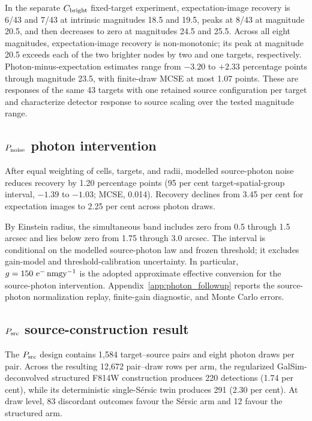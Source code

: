 In the separate \(C_{\rm bright}\) fixed-target experiment,
expectation-image recovery is 6/43 and 7/43 at intrinsic magnitudes 18.5 and 19.5,
peaks at 8/43 at magnitude 20.5, and then decreases to zero at magnitudes 24.5
and 25.5. Across all eight magnitudes, expectation-image recovery is
non-monotonic; its peak at magnitude 20.5 exceeds each of the two brighter
nodes by two and one targets, respectively.
Photon-minus-expectation estimates range from \(-3.20\) to \(+2.33\)
percentage points through magnitude 23.5, with finite-draw MCSE at most 1.07
points. These are responses of the same 43 targets with one retained source
configuration per target and characterize detector response to source scaling
over the tested magnitude range.

\subsection{\(P_{\rm noise}\) photon intervention}
\label{sec:poisson_results}

After equal weighting of cells, targets, and radii, modelled source-photon
noise reduces recovery by 1.20 percentage points (95 per cent
target-spatial-group interval, \(-1.39\) to \(-1.03\); MCSE, 0.014). Recovery
declines from 3.45 per cent for expectation images to 2.25 per cent across
photon draws.

By Einstein radius, the simultaneous band includes zero from 0.5 through
1.5 arcsec and lies below zero from 1.75 through 3.0 arcsec. The interval is
conditional on the modelled source-photon law and frozen threshold; it
excludes gain-model and threshold-calibration uncertainty. In particular,
\(g=150\ {\rm e^{-}\,nmgy^{-1}}\) is the adopted approximate effective
conversion for the source-photon intervention.
Appendix~\ref{app:photon_followup} reports the source-photon normalization
replay, finite-gain diagnostic, and Monte Carlo errors.

\subsection{\(P_{\rm src}\) source-construction result}
\label{sec:paired_source_results}

The \(P_{\rm src}\) design contains 1,584 target--source pairs and eight
photon draws per pair. Across the resulting 12,672 pair--draw rows per arm,
the regularized GalSim-deconvolved structured F814W construction produces 220
detections (1.74 per cent), while its deterministic single-S\'{e}rsic twin
produces 291 (2.30 per cent). At draw level, 83 discordant outcomes favour
the S\'{e}rsic arm and 12 favour the structured arm.

